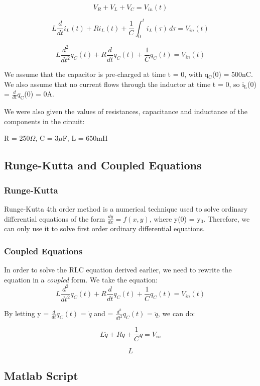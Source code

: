 \documentclass[12pt,twoside]{article}
\begin{document}
\[
V_{R} + V_{L} + V_{C} = V_{in}(t)
\]

\[
L \frac{d}{dt}i_{L}(t) + R i_{L}(t) + \frac{1}{C} \int_0^t i_{L}(\tau) \,d\tau = V_{in}(t)
\]

\[
L \frac{d^2}{dt^2} q_{C}(t) + R \frac{d}{dt} q_{C}(t) + \frac{1}{C}  q_{C}(t) = V_{in}(t)
\]

We assume that the capacitor is pre-charged at time t = 0, with q$_{\text{C}}$(0) = 500nC. We also assume that no current flows through the inductor at time t = 0, so i$_{\text{L}}$(0) = $\frac{d}{dt}q_{\text{C}}$(0) = 0A.

We were also given the values of resistances, capacitance and inductance of the components in the circuit:

\begin{center}
R = 250$\Omega$, C = 3$\mu$F, L = 650mH 
\end{center}

\subsection{Runge-Kutta and Coupled Equations}
\subsubsection{Runge-Kutta}
Runge-Kutta 4th order method is a numerical technique used to solve ordinary differential equations of the form $\frac{dy}{dx} = f(x,y)$, where y(0) = y$_{\text{0}}$. Therefore, we can only use it to solve first order ordinary differential equations.

\subsubsection{Coupled Equations}
In order to solve the RLC equation derived earlier, we need to rewrite the equation in a \textit{coupled} form. We take the equation:
\[
L \frac{d^2}{dt^2} q_{C}(t) + R \frac{d}{dt} q_{C}(t) + \frac{1}{C}  q_{C}(t) = V_{in}(t)
\]

By letting  y = $\frac{d}{dt}q_{C}(t)$ = $\dot{q}$ and  = $\frac{d^2}{dt^2}q_{C}(t)$ = $\ddot{q}$, we can do:

\[
L\ddot{q} + R\dot{q} + \frac{1}{C}q = V_{in}
\]

\[
L
\]

\subsection{Matlab Script}
\end{document}
